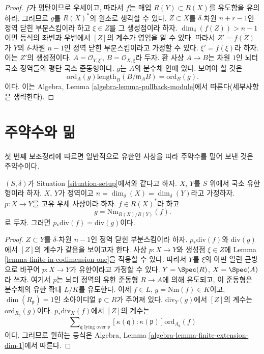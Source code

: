 \begin{proof}
$f$가 평탄이므로 우세이고, 따라서 $f$는 매입
$R(Y) \subset R(X)$를 유도함을 유의하라. 그러므로 $g$를
$R(X)^*$의 원소로 생각할 수 있다. $Z \subset X$를
$\delta$-차원 $n + r - 1$인 정역 닫힌 부분스킴이라 하고
$\xi \in Z$를 그 생성점이라 하자. $\dim_\delta(f(Z)) > n - 1$이면
등식의 좌변과 우변에서 $[Z]$의 계수가 영임을 알 수 있다. 따라서
$Z' = \overline{f(Z)}$가 $Y$의 $\delta$-차원 $n - 1$인 정역 닫힌
부분스킴이라고 가정할 수 있다. $\xi' = f(\xi)$라 하자. 이는 $Z'$의
생성점이다. $A = \mathcal{O}_{Y, \xi'}$,
$B = \mathcal{O}_{X, \xi}$라 두자. 환 사상 $A \to B$는 차원 $1$인
뇌터 국소 정역들의 평탄 국소 준동형이다. $g$는 $A$의 분수체 안에 있다.
보여야 할 것은
$$
\text{ord}_A(g) \text{length}_B(B/\mathfrak m_AB)
=
\text{ord}_B(g).
$$
이다. 이는 Algebra, Lemma \ref{algebra-lemma-pullback-module}에서
따른다(세부사항은 생략한다).
\end{proof}











\section{주약수와 밂}
\label{section-two-fun}

\noindent
첫 번째 보조정리에 따르면 일반적으로 유한인 사상을 따라 주약수를
밀어 보낸 것은 주약수이다.

\begin{lemma}
\label{lemma-proper-pushforward-alteration}
$(S, \delta)$가 Situation \ref{situation-setup}에서와 같다고 하자.
$X$, $Y$를 $S$ 위에서 국소 유한형이라 하자. $X$, $Y$가 정역이고
$n = \dim_\delta(X) = \dim_\delta(Y)$라고 가정하자.
$p : X \to Y$를 고유 우세 사상이라 하자. $f \in R(X)^*$라 하고
$$
g = \text{Nm}_{R(X)/R(Y)}(f).
$$
로 두자. 그러면 $p_*\text{div}(f) = \text{div}(g)$이다.
\end{lemma}

\begin{proof}
$Z \subset Y$를 $\delta$-차원 $n - 1$인 정역 닫힌 부분스킴이라 하자.
$p_*\text{div}(f)$와 $\text{div}(g)$에서 $[Z]$의 계수가 같음을 보이고자
한다. 사상 $p : X \to Y$와 생성점 $\xi \in Z$에 Lemma
\ref{lemma-finite-in-codimension-one}을 적용할 수 있다. 따라서 $Y$를
$\xi$의 아핀 열린 근방으로 바꾸어 $p : X \to Y$가 유한이라고 가정할
수 있다. $Y = \Spec(R)$, $X = \Spec(A)$라 쓰자. 여기서 $p$는 뇌터
정역의 유한 준동형 $R \to A$에 의해 유도되고, 이 준동형은 분수체의
유한 확대 $L/K$를 유도한다. 이제 $f \in L$,
$g = \text{Nm}(f) \in K$이고,
$\dim(R_{\mathfrak p}) = 1$인 소아이디얼 $\mathfrak p \subset R$가
주어져 있다. $\text{div}_Y(g)$에서 $[Z]$의 계수는
$\text{ord}_{R_\mathfrak p}(g)$이다. $p_*\text{div}_X(f)$에서 $[Z]$의
계수는
$$
\sum\nolimits_{\mathfrak q\text{ lying over }\mathfrak p}
[\kappa(\mathfrak q) : \kappa(\mathfrak p)]
\text{ord}_{A_{\mathfrak q}}(f)
$$
이다. 그러므로 원하는 등식은 Algebra, Lemma
\ref{algebra-lemma-finite-extension-dim-1}에서 따른다.
\end{proof}


